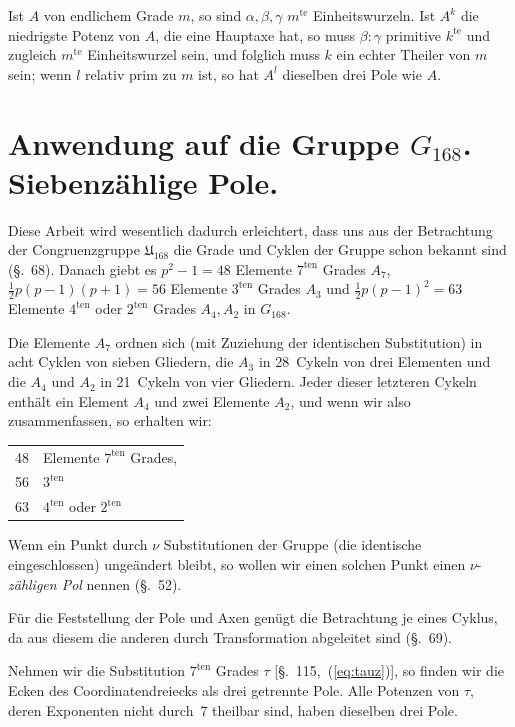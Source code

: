 \documentclass[12pt,a4paper]{article}
\begin{document}
Ist $A$ von endlichem Grade $m$, so sind $\alpha, \beta, \gamma$ $m^{\text{te}}$ Einheitswurzeln. Ist $A^k$ die niedrigste Potenz von $A$, die eine Hauptaxe hat, so muss $\beta:\gamma$ primitive $k^{\text{te}}$ und zugleich $m^{\text{te}}$ Einheitswurzel sein, und folglich muss $k$ ein echter Theiler von $m$ sein; wenn $l$ relativ prim zu $m$ ist, so hat $A^l$ dieselben drei Pole wie $A$.

\newpage
\section{Anwendung auf die Gruppe $G_{168}$. Siebenz\"ahlige Pole.}
\label{sec:117}

Diese Arbeit wird wesentlich dadurch erleichtert, dass uns aus der Betrachtung der Congruenzgruppe $\mathfrak{U}_{168}$ die Grade und Cyklen der Gruppe schon bekannt sind (\S.~68). Danach giebt es $p^2 - 1 = 48$ Elemente $7^{\text{ten}}$ Grades $A_7$, $\tfrac{1}{2}p(p-1)(p+1) = 56$ Elemente $3^{\text{ten}}$ Grades $A_3$ und $\tfrac{1}{2}p(p-1)^2 = 63$ Elemente $4^{\text{ten}}$ oder $2^{\text{ten}}$ Grades $A_4, A_2$ in $G_{168}$.

Die Elemente $A_7$ ordnen sich (mit Zuziehung der identischen Substitution) in acht Cyklen von sieben Gliedern, die $A_3$ in 28~Cykeln von drei Elementen und die $A_4$ und $A_2$ in 21~Cykeln von vier Gliedern. Jeder dieser letzteren Cykeln enth\"alt ein Element $A_4$ und zwei Elemente $A_2$, und wenn wir also zusammenfassen, so erhalten wir:
\begin{center}\begin{tabular}{rl}
48 & Elemente $7^{\text{ten}}$ Grades,\\
56 & \phantom{Elemente} $3^{\text{ten}}$ \phantom{Grades,}\\
63 & \phantom{Elemente} $4^{\text{ten}}$ oder $2^{\text{ten}}$ \phantom{Grades.}
\end{tabular}\end{center}

Wenn ein Punkt durch $\nu$ Substitutionen der Gruppe (die identische eingeschlossen) unge\"andert bleibt, so wollen wir einen solchen Punkt einen $\nu$-\textit{z\"ahligen Pol} nennen (\S.~52).

F\"ur die Feststellung der Pole und Axen gen\"ugt die Betrachtung je eines Cyklus, da aus diesem die anderen durch Transformation abgeleitet sind (\S.~69).

Nehmen wir die Substitution $7^{\text{ten}}$ Grades $\tau$ [\S.~115,~(\ref{eq:tauz})], so finden wir die Ecken des Coordinatendreiecks als drei getrennte Pole. Alle Potenzen von $\tau$, deren Exponenten nicht durch~7 theilbar sind, haben dieselben drei Pole.
\end{document}
